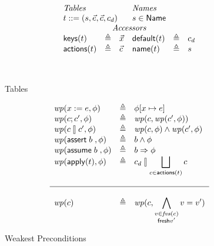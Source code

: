 \begin{figure}[ht]
  \[\begin{array}{l >{\triangleq}c l l >{\triangleq}c l}
      \multicolumn 3 l {\textit{Tables}}  & \multicolumn 3 l {\textit{Names}}\\
      \multicolumn 3 l {t::= (s,\vec e, \vec c, c_d)} & \multicolumn 3 l {s \in \Name}\\
      \multicolumn 6 c {\textit{Accessors}}\\
      \keys t && \vec x &  \default t && c_d \\
      \actions t && \vec c & \name t && s \\\\
 \\
      
    \end{array}\]

  \caption{Tables}
  \label{fig:tables}
\end{figure}

\begin{figure}[ht]
  \[\begin{array}{l >{\triangleq}c l}
      \wp(x:=e, \phi) && \phi[x \mapsto e]\\
      \wp(c;c', \phi) && \wp(c, \wp(c', \phi)) \\
      \wp(c\angel c', \phi) && \wp(c, \phi) \wedge \wp(c',\phi) \\
      \wp(\assert b, \phi) && b \wedge \phi \\
      \wp(\assume b, \phi) && b \Rightarrow \phi \\
      \wp(\apply t, \phi) && c_d \angel \displaystyle \Angel_{c \in \actions t}c\\\\\hline\\
      
      \wp(c) && \wp(c,\displaystyle \bigwedge_{\substack{v \in \fvs(c) \\ \mathsf{fresh} v'}}
      v = v')
    \end{array}\]
  \caption{Weakest Preconditions}
  \label{fig:wp}
\end{figure}

